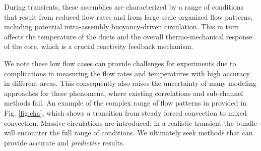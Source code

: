During transients, these assemblies are characterized by a range of conditions
that result from reduced flow rates and from large-scale organized flow
patterns, including potential intra-assembly buoyancy-driven circulation. This in turn affects the temperature of the ducts and the overall thermo-mechanical response of the core, which is a crucial reactivity feedback mechanism.

We note these
low flow cases can provide challenges for experiments due to complications in
measuring the flow rates and temperatures with high accuracy in different
areas. This consequently also raises the uncertainty of many modeling
approaches for these phenomena, where existing correlations and sub-channel
methods fail. An example of the complex range of flow patterns in provided in
Fig. \ref{fig:cha}, which shows a transition from steady forced convection to
mixed convection.  Massive circulations are introduced: in a realistic
transient the bundle will encounter the full range of conditions. We ultimately
seek methods that can provide accurate and \textit{predictive} results.








